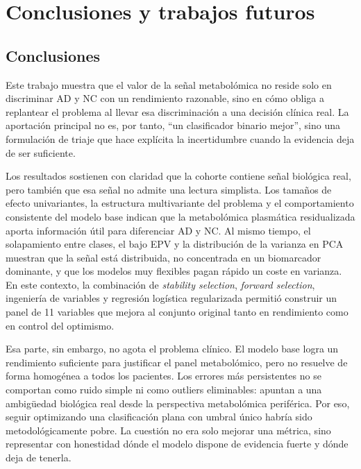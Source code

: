 \chapter{Conclusiones y trabajos futuros}\label{chap:conclusiones}

\section{Conclusiones}

Este trabajo muestra que el valor de la señal metabolómica no reside solo en discriminar AD y NC con un rendimiento razonable, sino en cómo obliga a replantear el problema al llevar esa discriminación a una decisión clínica real. La aportación principal no es, por tanto, ``un clasificador binario mejor'', sino una formulación de triaje que hace explícita la incertidumbre cuando la evidencia deja de ser suficiente.

Los resultados sostienen con claridad que la cohorte contiene señal biológica real, pero también que esa señal no admite una lectura simplista. Los tamaños de efecto univariantes, la estructura multivariante del problema y el comportamiento consistente del modelo base indican que la metabolómica plasmática residualizada aporta información útil para diferenciar AD y NC. Al mismo tiempo, el solapamiento entre clases, el bajo EPV y la distribución de la varianza en PCA muestran que la señal está distribuida, no concentrada en un biomarcador dominante, y que los modelos muy flexibles pagan rápido un coste en varianza. En este contexto, la combinación de \textit{stability selection}, \textit{forward selection}, ingeniería de variables y regresión logística regularizada permitió construir un panel de 11 variables que mejora al conjunto original tanto en rendimiento como en control del optimismo.

Esa parte, sin embargo, no agota el problema clínico. El modelo base logra un rendimiento suficiente para justificar el panel metabolómico, pero no resuelve de forma homogénea a todos los pacientes. Los errores más persistentes no se comportan como ruido simple ni como outliers eliminables: apuntan a una ambigüedad biológica real desde la perspectiva metabolómica periférica. Por eso, seguir optimizando una clasificación plana con umbral único habría sido metodológicamente pobre. La cuestión no era solo mejorar una métrica, sino representar con honestidad dónde el modelo dispone de evidencia fuerte y dónde deja de tenerla.

